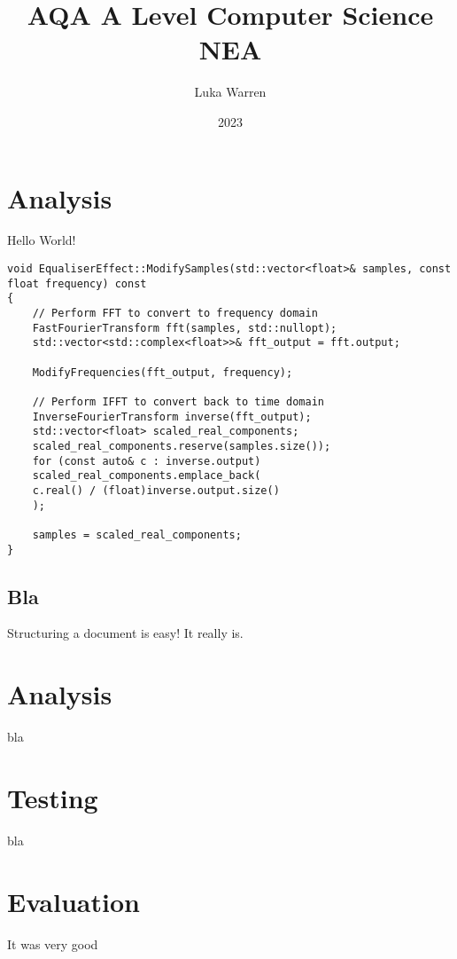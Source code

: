 \documentclass{article}
\title{AQA A Level Computer Science NEA}
\date{2023}
\author{Luka Warren}
\begin{document}
	
	\maketitle
	\tableofcontents
	\newpage
	
	
	\section{Analysis}
	Hello World!
	
	\begin{verbatim}
void EqualiserEffect::ModifySamples(std::vector<float>& samples, const float frequency) const
{
	// Perform FFT to convert to frequency domain
	FastFourierTransform fft(samples, std::nullopt);
	std::vector<std::complex<float>>& fft_output = fft.output;
	
	ModifyFrequencies(fft_output, frequency);
	
	// Perform IFFT to convert back to time domain
	InverseFourierTransform inverse(fft_output);
	std::vector<float> scaled_real_components;
	scaled_real_components.reserve(samples.size());
	for (const auto& c : inverse.output)
	scaled_real_components.emplace_back(
	c.real() / (float)inverse.output.size()
	);
	
	samples = scaled_real_components;
}
	\end{verbatim}
	
	\subsection*{Bla}
	Structuring a document is easy!
	It really is.
	
	\section{Analysis}
	bla
	\section{Testing}
	bla
	\section{Evaluation}
	It  was very good
	
	
\end{document}
